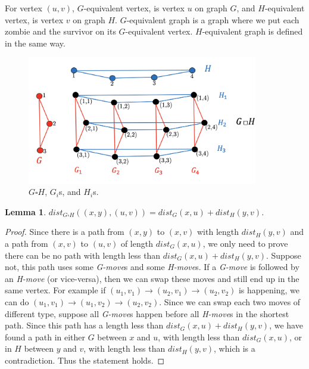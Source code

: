 \documentclass[1p]{elsarticle}
\newtheorem{lemma}[theorem]{Lemma}
\begin{document}
For vertex $(u,v)$, $G$-equivalent vertex, is vertex $u$ on graph $G$, and $H$-equivalent vertex, is vertex $v$ on graph
$H$. $G$-equivalent graph is a graph where we put each zombie and the survivor on its $G$-equivalent vertex.
$H$-equivalent graph is defined in the same way.


\begin{figure}[h!]
	
	\centering
	\includegraphics[width=0.9\textwidth]{fig/cp3.png}
	\caption{$G \square H$, $G_i$s, and $H_i$s.}
	\label{fig:p1}
\end{figure}



\begin{lemma} \label{shortestpathlemma}
	$dist_{G \square H}((x,y),(u,v)) = dist_G(x,u) + dist_H(y,v)$.
\end{lemma}
\begin{proof}
	Since there is a path from $(x,y)$ to $(x,v)$ with length $dist_H(y,v)$ and a path from $(x,v)$ to $(u,v)$ of length
	$dist_G(x,u)$, we only need to prove there can be no path with length less than $dist_G(x,u) + dist_H(y,v)$.
	Suppose not, this path uses some {\it G-move}s and some {\it H-move}s. If a {\it G-move} is followed by an {\it
	H-move} (or vice-versa), then we can swap these moves and still end up in the same vertex. For example if $(u_1,v_1)
	\rightarrow (u_2,v_1) \rightarrow (u_2,v_2)$ is happening, we can do $(u_1,v_1) \rightarrow (u_1,v_2) \rightarrow
	(u_2,v_2)$. Since we can swap each two moves of different type, suppose all {\it G-move}s happen before all {\it
	H-move}s in the shortest path. Since this path has a length less than $dist_G(x,u) + dist_H(y,v)$, we have found a
	path in either $G$ between $x$ and $u$, with length less than $dist_G(x,u)$, or in $H$ between $y$ and $v$, with
	length less than $dist_H(y,v)$, which is a contradiction. Thus the statement holds.
\end{proof}
\end{document}
